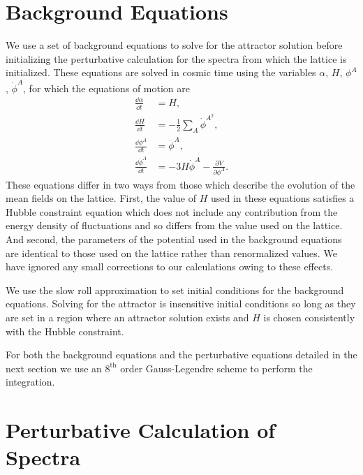 

\section{Background Equations}
We use a set of background equations to solve for the attractor solution before initializing the perturbative calculation for the spectra from which the lattice is initialized. These equations are solved in cosmic time using the variables $\alpha$, $H$, $\phi^A$, $\dot{\phi}^A$, for which the equations of motion are
\begin{align}
  \frac{\dd\alpha}{\dd t} &= H, \\
  \frac{\dd H}{\dd t} &= -\frac{1}{2}\sum_A\dot{\phi}^{A^2}, \\
  \frac{\dd\phi^A}{\dd t} &= \dot{\phi}^A, \\
  \frac{\dd\dot{\phi}^A}{\dd t} &= -3H\dot{\phi}^A - \frac{\partial V}{\partial\phi^A}.
\end{align}
These equations differ in two ways from those which describe the evolution of the mean fields on the lattice. First, the value of $H$ used in these equations satisfies a Hubble constraint equation which does not include any contribution from the energy density of fluctuations and so differs from the value used on the lattice. And second, the parameters of the potential used in the background equations are identical to those used on the lattice rather than renormalized values. We have ignored any small corrections to our calculations owing to these effects.

We use the slow roll approximation to set initial conditions for the background equations. Solving for the attractor is insensitive initial conditions so long as they are set in a region where an attractor solution exists and $H$ is chosen consistently with the Hubble constraint. 

For both the background equations and the perturbative equations detailed in the next section we use an $8^\mathrm{th}$ order Gauss-Legendre scheme to perform the integration.

\section{Perturbative Calculation of Spectra}

